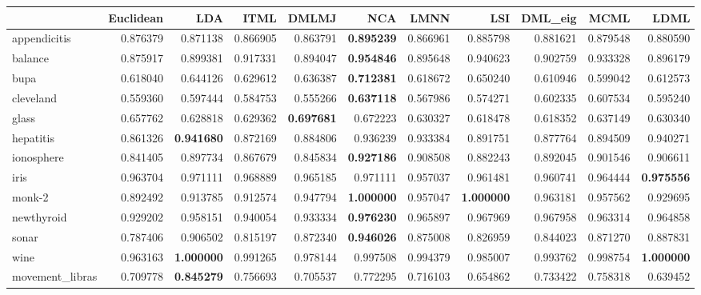\begin{tabular}{lrrrrrrrrrr}
\toprule
{} &  Euclidean &       LDA &      ITML &     DMLMJ &       NCA &      LMNN &       LSI &   DML\_eig &      MCML &      LDML \\
\midrule
appendicitis    &   0.876379 &  0.871138 &  0.866905 &  0.863791 &  \textbf{0.895239} &  0.866961 &  0.885798 &  0.881621 &  0.879548 &  0.880590 \\
balance         &   0.875917 &  0.899381 &  0.917331 &  0.894047 &  \textbf{0.954846} &  0.895648 &  0.940623 &  0.902759 &  0.933328 &  0.896179 \\
bupa            &   0.618040 &  0.644126 &  0.629612 &  0.636387 &  \textbf{0.712381} &  0.618672 &  0.650240 &  0.610946 &  0.599042 &  0.612573 \\
cleveland       &   0.559360 &  0.597444 &  0.584753 &  0.555266 &  \textbf{0.637118} &  0.567986 &  0.574271 &  0.602335 &  0.607534 &  0.595240 \\
glass           &   0.657762 &  0.628818 &  0.629362 &  \textbf{0.697681} &  0.672223 &  0.630327 &  0.618478 &  0.618352 &  0.637149 &  0.630340 \\
hepatitis       &   0.861326 &  \textbf{0.941680} &  0.872169 &  0.884806 &  0.936239 &  0.933384 &  0.891751 &  0.877764 &  0.894509 &  0.940271 \\
ionosphere      &   0.841405 &  0.897734 &  0.867679 &  0.845834 &  \textbf{0.927186} &  0.908508 &  0.882243 &  0.892045 &  0.901546 &  0.906611 \\
iris            &   0.963704 &  0.971111 &  0.968889 &  0.965185 &  0.971111 &  0.957037 &  0.961481 &  0.960741 &  0.964444 &  \textbf{0.975556} \\
monk-2          &   0.892492 &  0.913785 &  0.912574 &  0.947794 &  \textbf{1.000000} &  0.957047 &  \textbf{1.000000} &  0.963181 &  0.957562 &  0.929695 \\
newthyroid      &   0.929202 &  0.958151 &  0.940054 &  0.933334 &  \textbf{0.976230} &  0.965897 &  0.967969 &  0.967958 &  0.963314 &  0.964858 \\
sonar           &   0.787406 &  0.906502 &  0.815197 &  0.872340 &  \textbf{0.946026} &  0.875008 &  0.826959 &  0.844023 &  0.871270 &  0.887831 \\
wine            &   0.963163 &  \textbf{1.000000} &  0.991265 &  0.978144 &  0.997508 &  0.994379 &  0.985007 &  0.993762 &  0.998754 &  \textbf{1.000000} \\
movement\_libras &   0.709778 &  \textbf{0.845279} &  0.756693 &  0.705537 &  0.772295 &  0.716103 &  0.654862 &  0.733422 &  0.758318 &  0.639452 \\

\end{tabular}

